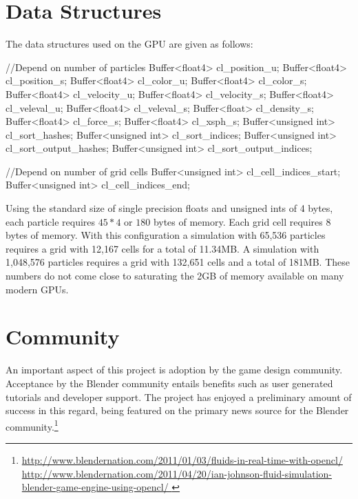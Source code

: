 \section{Data Structures}
The data structures used on the GPU are given as follows:

\begin{cppcode}{0}
        //Depend on number of particles
        Buffer<float4>      cl_position_u;
        Buffer<float4>      cl_position_s;
        Buffer<float4>      cl_color_u;
        Buffer<float4>      cl_color_s;
        Buffer<float4>      cl_velocity_u;
        Buffer<float4>      cl_velocity_s;
        Buffer<float4>      cl_veleval_u;
        Buffer<float4>      cl_veleval_s;
        Buffer<float>       cl_density_s;
        Buffer<float4>      cl_force_s;
        Buffer<float4>      cl_xsph_s;
        Buffer<unsigned int>         cl_sort_hashes;
        Buffer<unsigned int>         cl_sort_indices;
        Buffer<unsigned int>         cl_sort_output_hashes;
        Buffer<unsigned int>         cl_sort_output_indices;

        //Depend on number of grid cells
        Buffer<unsigned int>         cl_cell_indices_start;
        Buffer<unsigned int>         cl_cell_indices_end;
\end{cppcode}

Using the standard size of single precision floats and unsigned ints of 4
bytes, each particle requires $45*4$ or $180$ bytes of memory. Each grid cell
requires $8$ bytes of memory. With this configuration a simulation with 65,536
particles requires a grid with 12,167 cells for a total of 11.34MB. A
simulation with 1,048,576 particles requires a grid with 132,651 cells and a
total of 181MB. These numbers do not come close to saturating the 2GB of memory
available on many modern GPUs.


\section{Community}
An important aspect of this project is adoption by the game design community.
Acceptance by the Blender community entails benefits such as user generated
tutorials and developer support. The project has enjoyed a preliminary amount
of success in this regard, being featured on the primary news source for
the Blender community.\footnote{
\url{http://www.blendernation.com/2011/01/03/fluids-in-real-time-with-opencl/}
\\ 
\url{
http://www.blendernation.com/2011/04/20/ian-johnson-fluid-simulation-blender-game-engine-using-opencl/
} }

